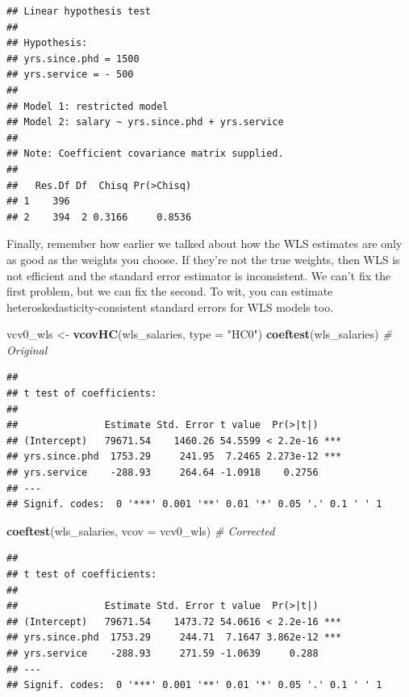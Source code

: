 \documentclass[
  12pt,
  oneside,openany]{book}
\newenvironment{Shaded}{\begin{snugshade}}{\end{snugshade}}
\newcommand{\CommentTok}[1]{\textcolor[rgb]{0.56,0.35,0.01}{\textit{#1}}}
\newcommand{\DataTypeTok}[1]{\textcolor[rgb]{0.13,0.29,0.53}{#1}}
\newcommand{\KeywordTok}[1]{\textcolor[rgb]{0.13,0.29,0.53}{\textbf{#1}}}
\newcommand{\NormalTok}[1]{#1}
\newcommand{\StringTok}[1]{\textcolor[rgb]{0.31,0.60,0.02}{#1}}
\begin{document}
\begin{verbatim}
## Linear hypothesis test
## 
## Hypothesis:
## yrs.since.phd = 1500
## yrs.service = - 500
## 
## Model 1: restricted model
## Model 2: salary ~ yrs.since.phd + yrs.service
## 
## Note: Coefficient covariance matrix supplied.
## 
##   Res.Df Df  Chisq Pr(>Chisq)
## 1    396                     
## 2    394  2 0.3166     0.8536
\end{verbatim}

Finally, remember how earlier we talked about how the WLS estimates are only as good as the weights you choose. If they're not the true weights, then WLS is not efficient and the standard error estimator is inconsistent. We can't fix the first problem, but we can fix the second. To wit, you can estimate heteroskedasticity-consistent standard errors for WLS models too.

\begin{Shaded}
\begin{Highlighting}[]
\NormalTok{vcv0\_wls <{-}}\StringTok{ }\KeywordTok{vcovHC}\NormalTok{(wls\_salaries, }\DataTypeTok{type =} \StringTok{"HC0"}\NormalTok{)}
\KeywordTok{coeftest}\NormalTok{(wls\_salaries)  }\CommentTok{\# Original}
\end{Highlighting}
\end{Shaded}

\begin{verbatim}
## 
## t test of coefficients:
## 
##               Estimate Std. Error t value  Pr(>|t|)    
## (Intercept)   79671.54    1460.26 54.5599 < 2.2e-16 ***
## yrs.since.phd  1753.29     241.95  7.2465 2.273e-12 ***
## yrs.service    -288.93     264.64 -1.0918    0.2756    
## ---
## Signif. codes:  0 '***' 0.001 '**' 0.01 '*' 0.05 '.' 0.1 ' ' 1
\end{verbatim}

\begin{Shaded}
\begin{Highlighting}[]
\KeywordTok{coeftest}\NormalTok{(wls\_salaries, }\DataTypeTok{vcov =}\NormalTok{ vcv0\_wls)  }\CommentTok{\# Corrected}
\end{Highlighting}
\end{Shaded}

\begin{verbatim}
## 
## t test of coefficients:
## 
##               Estimate Std. Error t value  Pr(>|t|)    
## (Intercept)   79671.54    1473.72 54.0616 < 2.2e-16 ***
## yrs.since.phd  1753.29     244.71  7.1647 3.862e-12 ***
## yrs.service    -288.93     271.59 -1.0639     0.288    
## ---
## Signif. codes:  0 '***' 0.001 '**' 0.01 '*' 0.05 '.' 0.1 ' ' 1
\end{verbatim}
\end{document}
